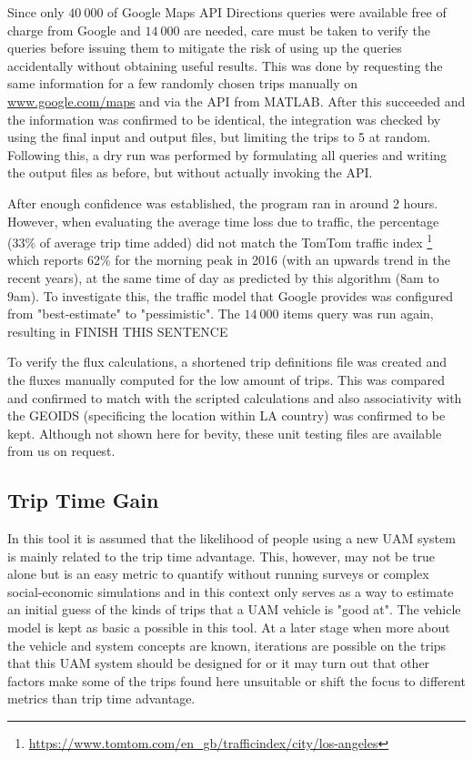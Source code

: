 Since only $40\ 000$ of Google Maps API Directions queries were available free of charge from Google and $14\ 000$ are needed, care must be taken to verify the queries before issuing them to mitigate the risk of using up the queries accidentally without obtaining useful results. This was done by requesting the same information for a few randomly chosen trips manually on \url{www.google.com/maps} and via the API from MATLAB. After this succeeded and the information was confirmed to be identical, the integration was checked by using the final input and output files, but limiting the trips to 5 at random. Following this, a dry run was performed by formulating all queries and writing the output files as before, but without actually invoking the API. 

After enough confidence was established, the program ran in around 2 hours. However, when evaluating the average time loss due to traffic, the percentage (33\% of average trip time added) did not match the TomTom traffic index \footnote{\url{https://www.tomtom.com/en_gb/trafficindex/city/los-angeles}} which reports 62\% for the morning peak in 2016 (with an upwards trend in the recent years), at the same time of day as predicted by this algorithm (8am to 9am). To investigate this, the traffic model that Google provides was configured from "best-estimate" to "pessimistic". The $14\ 000$ items query was run again, resulting in FINISH THIS SENTENCE

To verify the flux calculations, a shortened trip definitions file was created and the fluxes manually computed for the low amount of trips. This was compared and confirmed to match with the scripted calculations and also associativity with the GEOIDS (specificing the location within LA country) was confirmed to be kept. Although not shown here for bevity, these unit testing files are available from us on request.



\iffalse
\subsection{Trip Time Gain}

In this tool it is assumed that the likelihood of people using a new UAM system is mainly related to the trip time advantage. This, however, may not be true alone but is an easy metric to quantify without running surveys or complex social-economic simulations and in this context only serves as a way to estimate an initial guess of the kinds of trips that a UAM vehicle is "good at". The vehicle model is kept as basic a possible in this tool. At a later stage when more about the vehicle and system concepts are known, iterations are possible on the trips that this UAM system should be designed for or it may turn out that other factors make some of the trips found here unsuitable or shift the focus to different metrics than trip time advantage.

